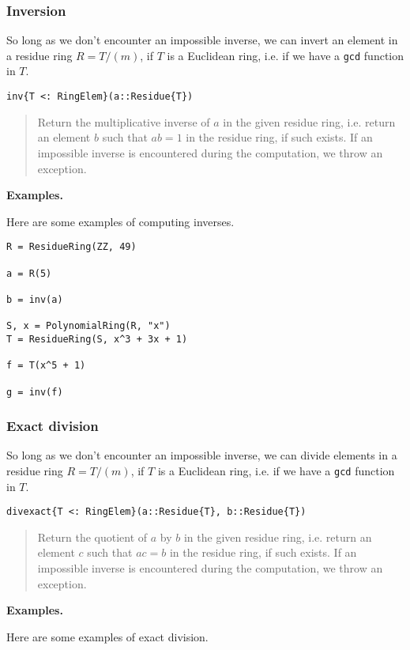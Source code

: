 \documentclass[a4paper,10pt]{article}
\newcommand{\code}{\lstinline}
\newcommand{\desc}[1]{\vspace{-3mm}\begin{quote}#1\end{quote}}
\begin{document}
\subsubsection{Inversion}

So long as we don't encounter an impossible inverse, we can
invert an element in a residue ring $R = T/(m)$, if $T$ is a
Euclidean ring, i.e. if we have a \code{gcd} function in $T$.

\begin{lstlisting}
inv{T <: RingElem}(a::Residue{T})
\end{lstlisting}

\desc{Return the multiplicative inverse of $a$ in the given residue
ring, i.e. return an element $b$ such that $ab = 1$ in the residue ring,
if such exists. If an impossible inverse is encountered during the
computation, we throw an exception.}

\textbf{Examples.}

Here are some examples of computing inverses.

\begin{lstlisting}
R = ResidueRing(ZZ, 49)

a = R(5)

b = inv(a)

S, x = PolynomialRing(R, "x")
T = ResidueRing(S, x^3 + 3x + 1)

f = T(x^5 + 1)

g = inv(f)
\end{lstlisting}

\subsubsection{Exact division}

So long as we don't encounter an impossible inverse, we can
divide elements in a residue ring $R = T/(m)$, if $T$ is a
Euclidean ring, i.e. if we have a \code{gcd} function in $T$.

\begin{lstlisting}
divexact{T <: RingElem}(a::Residue{T}, b::Residue{T})
\end{lstlisting}

\desc{Return the quotient of $a$ by $b$ in the given residue
ring, i.e. return an element $c$ such that $ac = b$ in the residue ring,
if such exists. If an impossible inverse is encountered during the
computation, we throw an exception.}

\textbf{Examples.}

Here are some examples of exact division.
\end{document}
